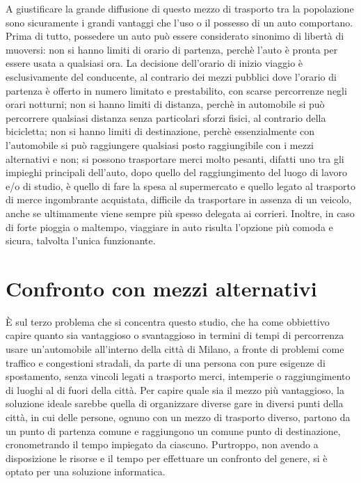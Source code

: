 A giustificare la grande diffusione di questo mezzo di trasporto tra la popolazione sono sicuramente i grandi vantaggi che l'uso o il possesso di un auto comportano. Prima di tutto, possedere un auto può essere considerato sinonimo di libertà di muoversi: non si hanno limiti di orario di partenza, perchè l'auto è pronta per essere usata a qualsiasi ora. La decisione dell'orario di inizio viaggio è esclusivamente del conducente, al contrario dei mezzi pubblici dove l'orario di partenza è offerto in numero limitato e prestabilito, con scarse percorrenze negli orari notturni; non si hanno limiti di distanza, perchè in automobile si può percorrere qualsiasi distanza senza particolari sforzi fisici, al contrario della bicicletta; non si hanno limiti di destinazione, perchè essenzialmente con l'automobile si può raggiungere qualsiasi posto raggiungibile con i mezzi alternativi e non; si possono trasportare merci molto pesanti, difatti uno tra gli impieghi principali dell'auto, dopo quello del raggiungimento del luogo di lavoro e/o di studio, è quello di fare la spesa al supermercato e quello legato al trasporto di merce ingombrante acquistata, difficile da trasportare in assenza di un veicolo, anche se ultimamente viene sempre più spesso delegata ai corrieri. Inoltre, in caso di forte pioggia o maltempo, viaggiare in auto risulta l'opzione più comoda e sicura, talvolta l'unica funzionante.

\section{Confronto con mezzi alternativi}

È sul terzo problema che si concentra questo studio, che ha come obbiettivo capire quanto sia vantaggioso o svantaggioso in termini di tempi di percorrenza usare un'automobile all'interno della città di Milano, a fronte di problemi come traffico e congestioni stradali, da parte di una persona con pure esigenze di spostamento, senza vincoli legati a trasporto merci, intemperie o raggiungimento di luoghi al di fuori della città. Per capire quale sia il mezzo più vantaggioso, la soluzione ideale sarebbe quella di organizzare diverse gare in diversi punti della città, in cui delle persone, ognuno con un mezzo di trasporto diverso, partono da un punto di partenza comune e raggiungono un comune punto di destinazione, cronometrando il tempo impiegato da ciascuno. Purtroppo, non avendo a disposizione le risorse e il tempo per effettuare un confronto del genere, si è optato per una soluzione informatica.
